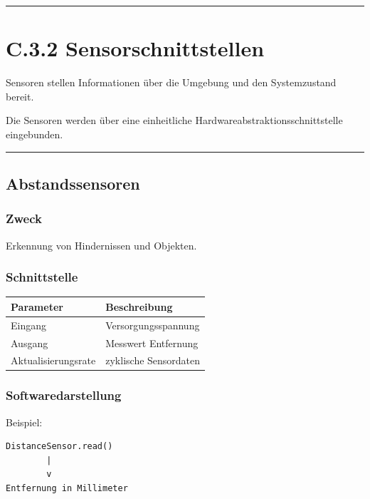 \documentclass[
]{article}
\begin{document}
\begin{center}\rule{0.5\linewidth}{0.5pt}\end{center}

\section{C.3.2 Sensorschnittstellen}\label{c.3.2-sensorschnittstellen}

Sensoren stellen Informationen über die Umgebung und den Systemzustand
bereit.

Die Sensoren werden über eine einheitliche
Hardwareabstraktionsschnittstelle eingebunden.

\begin{center}\rule{0.5\linewidth}{0.5pt}\end{center}

\subsection{Abstandssensoren}\label{abstandssensoren-1}

\subsubsection{Zweck}\label{zweck}

Erkennung von Hindernissen und Objekten.

\subsubsection{Schnittstelle}\label{schnittstelle}

\begin{longtable}[]{@{}ll@{}}
\toprule\noalign{}
Parameter & Beschreibung \\
\midrule\noalign{}
\endhead
\bottomrule\noalign{}
\endlastfoot
Eingang & Versorgungsspannung \\
Ausgang & Messwert Entfernung \\
Aktualisierungsrate & zyklische Sensordaten \\
\end{longtable}

\subsubsection{Softwaredarstellung}\label{softwaredarstellung}

Beispiel:

\begin{verbatim}
DistanceSensor.read()
        |
        v
Entfernung in Millimeter
\end{verbatim}
\end{document}
